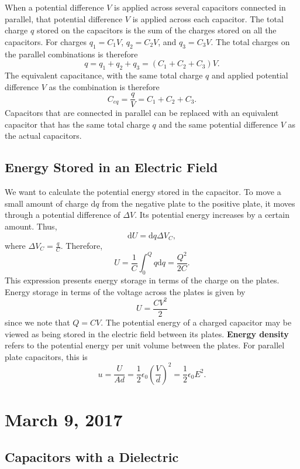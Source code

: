 \documentclass[11pt]{article}
\theoremstyle{plain} %
\theoremstyle{definition}
\theoremstyle{example}
\theoremstyle{remark}
\begin{document}
When a potential difference $V$ is applied across several capacitors connected in parallel, that potential difference $V$ is applied across each capacitor. The total charge $q$ stored on the capacitors is the sum of the charges stored on all the capacitors. For charges $q_ 1 = C_1V$, $q_2 = C_2V$, and $q_3 = C_3V$. The total charges on the parallel combinations is therefore
$$q = q_1+q_2+q_3 = (C_1+C_2+C_3)V.$$
The equivalent capacitance, with the same total charge $q$ and applied potential difference $V$ as the combination is therefore 
$$C_{eq} = \frac{q}{V} = C_1+C_2+C_3.$$
Capacitors that are connected in parallel can be replaced with an equivalent capacitor that has the same total charge $q$ and the same potential difference $V$ as the actual capacitors. 

\subsection{Energy Stored in an Electric Field}

We want to calculate the potential energy stored in the capacitor. To move a small amount of charge $\mathrm d q$ from the negative plate to the positive plate, it moves through a potential difference of $\Delta V$. Its potential energy increases by a certain amount. Thus, 
$$\mathrm d U = \mathrm d q\Delta V_C,$$
where $\Delta V_C = \frac{q}{C}.$
Therefore,
$$U = \frac{1}{C} \int_0^Qq\mathrm d q = \frac{Q^2}{2C}.$$
This expression presents energy storage in terms of the charge on the plates. Energy storage in terms of the voltage across the plates is given by $$U = \frac{CV^2}{2}$$
since we note that $Q=CV$. The potential energy of a charged capacitor may be viewed as being stored in the electric field between its plates. \textbf{Energy density} refers to the potential energy per unit volume between the plates. For parallel plate capacitors, this is 
$$u = \frac{U}{Ad} = \frac{1}{2}\epsilon_0\left(\frac{V}{d}\right)^2 = \frac{1}{2}\epsilon_0E^2.$$


\section{March 9, 2017}
\subsection{Capacitors with a Dielectric}
\end{document}
